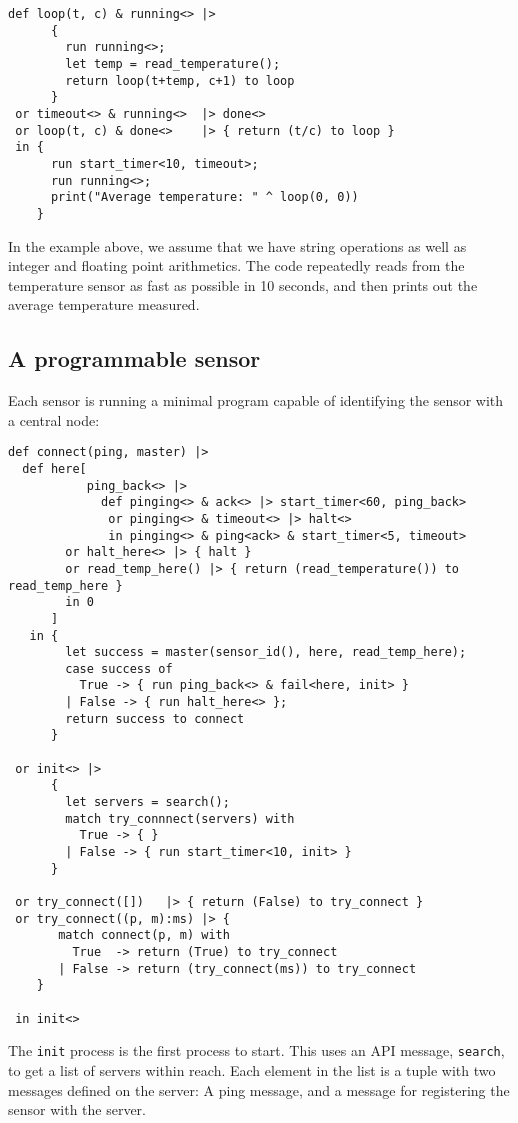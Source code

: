 \begin{verbatim}
def loop(t, c) & running<> |>
      {
        run running<>;
        let temp = read_temperature();
        return loop(t+temp, c+1) to loop
      }
 or timeout<> & running<>  |> done<>
 or loop(t, c) & done<>    |> { return (t/c) to loop }
 in {
      run start_timer<10, timeout>;
      run running<>;
      print("Average temperature: " ^ loop(0, 0))
    }
\end{verbatim}
In the example above, we assume that we have string operations as
well as integer and floating point arithmetics. The code repeatedly
reads from the temperature sensor as fast as possible in 10
seconds, and then prints out the average temperature measured.

\subsection{A programmable sensor}

Each sensor is running a minimal program capable of identifying the
sensor with a central node:

\begin{verbatim}
def connect(ping, master) |>
  def here[
           ping_back<> |>
             def pinging<> & ack<> |> start_timer<60, ping_back>
              or pinging<> & timeout<> |> halt<>
              in pinging<> & ping<ack> & start_timer<5, timeout>
        or halt_here<> |> { halt }
        or read_temp_here() |> { return (read_temperature()) to read_temp_here }
        in 0
      ]
   in {
        let success = master(sensor_id(), here, read_temp_here);
        case success of
          True -> { run ping_back<> & fail<here, init> }
        | False -> { run halt_here<> };
        return success to connect
      }

 or init<> |>
      {
        let servers = search();
        match try_connnect(servers) with
          True -> { }
        | False -> { run start_timer<10, init> }
      }

 or try_connect([])   |> { return (False) to try_connect }
 or try_connect((p, m):ms) |> {
       match connect(p, m) with
         True  -> return (True) to try_connect
       | False -> return (try_connect(ms)) to try_connect
    }

 in init<>
\end{verbatim}
The \verb!init! process is the first process to start. This uses an
API message, \verb!search!, to get a list of servers within reach.
Each element in the list is a tuple with two messages defined on
the server: A ping message, and a message for registering the
sensor with the server.

